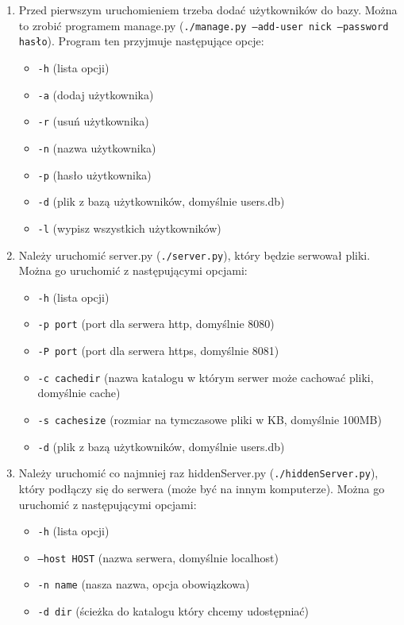 \documentclass[a4paper,notitlepage]{article}
\begin{document}
\begin{enumerate}
\item Przed pierwszym uruchomieniem trzeba dodać użytkowników do bazy. 
Można to zrobić programem manage.py 
(\texttt{./manage.py --add-user nick --password hasło}).
Program ten przyjmuje następujące opcje:
\begin{itemize}
    \item \texttt{-h} (lista opcji)
    \item \texttt{-a} (dodaj użytkownika)
    \item \texttt{-r} (usuń użytkownika)
    \item \texttt{-n} (nazwa użytkownika)
    \item \texttt{-p} (hasło użytkownika)
    \item \texttt{-d} (plik z bazą użytkowników, domyślnie users.db)
    \item \texttt{-l} (wypisz wszystkich użytkowników)
\end{itemize}
\item Należy uruchomić server.py (\texttt{./server.py}), który 
będzie serwował pliki. Można go uruchomić z następującymi opcjami:
    \begin{itemize}
    \item \texttt{-h} (lista opcji)
    \item \texttt{-p port} (port dla serwera http, domyślnie 8080)
    \item \texttt{-P port} (port dla serwera https, domyślnie 8081)
    \item \texttt{-c cachedir} (nazwa katalogu w którym serwer może cachować pliki, domyślnie cache)
    \item \texttt{-s cachesize} (rozmiar na tymczasowe pliki w KB, domyślnie 100MB)
    \item \texttt{-d} (plik z bazą użytkowników, domyślnie users.db)
    \end{itemize}
\item Należy uruchomić co najmniej raz hiddenServer.py 
(\texttt{./hiddenServer.py}), który podłączy się do serwera 
(może być na innym komputerze). Można go uruchomić z następującymi opcjami:
    \begin{itemize}
    \item \texttt{-h} (lista opcji)
    \item \texttt{--host HOST} (nazwa serwera, domyślnie localhost)
    \item \texttt{-n name} (nasza nazwa, opcja obowiązkowa)
    \item \texttt{-d dir} (ścieżka do katalogu który chcemy udostępniać)

\end{itemize}
\end{enumerate}
\end{document}
